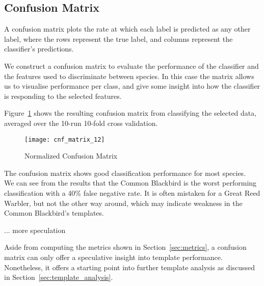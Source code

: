 \subsection{Confusion Matrix}
A confusion matrix plots the rate at which each label is predicted as any other
label, where the rows represent the true label, and columns represent the
classifier's predictions.

We construct a confusion matrix to evaluate the performance of the classifier
and the features used to discriminate between species.
In this case the matrix allows us to visualise performance per class, and give
some insight into how the classifier is responding to the selected features.

Figure~\ref{fig:cnf12} shows the resulting confusion matrix from classifying the
selected data, averaged over the 10-run 10-fold cross validation.

\begin{figure}[!htb]
  \centering
  \texttt{[image: cnf\_matrix\_12]}
  \caption{Normalized Confusion Matrix}\label{fig:cnf12}
\end{figure}

The confusion matrix shows good classification performance for most species.\\

We can see from the results that the Common Blackbird is the worst performing
classification with a 40\% false negative rate.
It is often mistaken for a Great Reed Warbler, but not the other way around,
which may indicate weakness in the Common Blackbird's templates.

... more speculation

Aside from computing the metrics shown in Section~\ref{sec:metrics}, a confusion
matrix can only offer a speculative insight into template performance.
Nonetheless, it offers a starting point into further template analysis as
discussed in Section~\ref{sec:template_analysis}.
